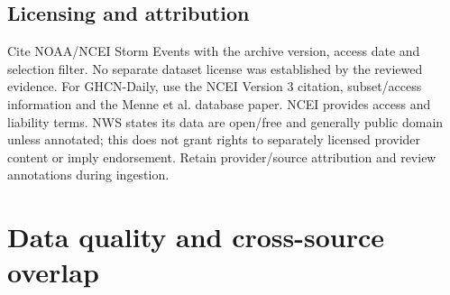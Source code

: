 \subsection{Licensing and attribution}
Cite NOAA/NCEI Storm Events with the archive version, access date and selection
filter. No separate dataset license was established by the reviewed evidence.
For GHCN-Daily, use the NCEI Version 3 citation, subset/access information and the
Menne et al. database paper. NCEI provides access and liability terms. NWS states
its data are open/free and generally public domain unless annotated; this does
not grant rights to separately licensed provider content or imply endorsement.
Retain provider/source attribution and review annotations during ingestion.

\section{Data quality and cross-source overlap}
